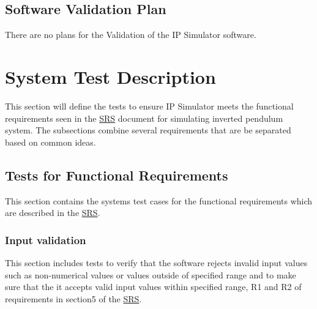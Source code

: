 \documentclass[12pt, titlepage]{article}
\begin{document}
\subsection{Software Validation Plan}

There are no plans for the Validation of the IP Simulator software.

\section{System Test Description}\label{test}
This section will define the tests to ensure IP Simulator meets the functional requirements seen in the \href{https://github.com/MinMah23/CAS741-Project/tree/main/docs/SRS/SRS.pdf}{SRS} document for simulating inverted pendulum system. The subsections combine several requirements that are be separated based on common ideas.

\subsection{Tests for Functional Requirements}
This section contains the systems test cases for the functional requirements which are described in the  \href{https://github.com/MinMah23/CAS741-Project/tree/main/docs/SRS/SRS.pdf}{SRS}.

\subsubsection{Input validation \label{inp_val}}
This section includes tests to verify that the software rejects invalid input values such as non-numerical values or values outside of specified range and to make sure that the it accepts valid input values within specified range, R1 and R2 of requirements in section5 of the  \href{https://github.com/MinMah23/CAS741-Project/tree/main/docs/SRS/SRS.pdf}{SRS}.
\end{document}
